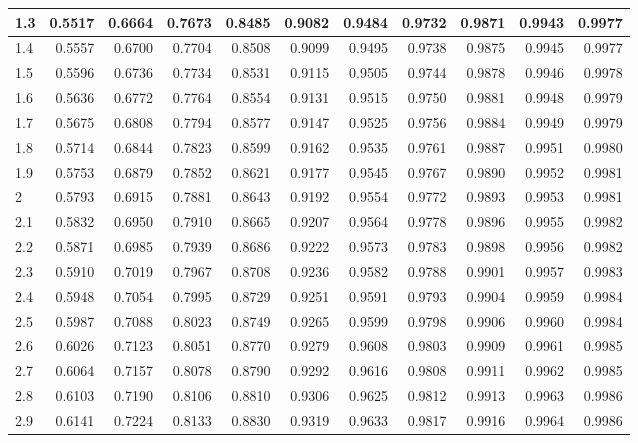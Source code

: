 \documentclass[
  12pt,
]{book}
\theoremstyle{definition}
\theoremstyle{definition}
\theoremstyle{definition}
\theoremstyle{definition}
\theoremstyle{remark}
\begin{document}
\begin{table}
\begin{tabular}[t]{l|r|r|r|r|r|r|r|r|r|r}
\hline
1.3 & 0.5517 & 0.6664 & 0.7673 & 0.8485 & 0.9082 & 0.9484 & 0.9732 & 0.9871 & 0.9943 & 0.9977\\
\hline
1.4 & 0.5557 & 0.6700 & 0.7704 & 0.8508 & 0.9099 & 0.9495 & 0.9738 & 0.9875 & 0.9945 & 0.9977\\
\hline
1.5 & 0.5596 & 0.6736 & 0.7734 & 0.8531 & 0.9115 & 0.9505 & 0.9744 & 0.9878 & 0.9946 & 0.9978\\
\hline
1.6 & 0.5636 & 0.6772 & 0.7764 & 0.8554 & 0.9131 & 0.9515 & 0.9750 & 0.9881 & 0.9948 & 0.9979\\
\hline
1.7 & 0.5675 & 0.6808 & 0.7794 & 0.8577 & 0.9147 & 0.9525 & 0.9756 & 0.9884 & 0.9949 & 0.9979\\
\hline
1.8 & 0.5714 & 0.6844 & 0.7823 & 0.8599 & 0.9162 & 0.9535 & 0.9761 & 0.9887 & 0.9951 & 0.9980\\
\hline
1.9 & 0.5753 & 0.6879 & 0.7852 & 0.8621 & 0.9177 & 0.9545 & 0.9767 & 0.9890 & 0.9952 & 0.9981\\
\hline
2 & 0.5793 & 0.6915 & 0.7881 & 0.8643 & 0.9192 & 0.9554 & 0.9772 & 0.9893 & 0.9953 & 0.9981\\
\hline
2.1 & 0.5832 & 0.6950 & 0.7910 & 0.8665 & 0.9207 & 0.9564 & 0.9778 & 0.9896 & 0.9955 & 0.9982\\
\hline
2.2 & 0.5871 & 0.6985 & 0.7939 & 0.8686 & 0.9222 & 0.9573 & 0.9783 & 0.9898 & 0.9956 & 0.9982\\
\hline
2.3 & 0.5910 & 0.7019 & 0.7967 & 0.8708 & 0.9236 & 0.9582 & 0.9788 & 0.9901 & 0.9957 & 0.9983\\
\hline
2.4 & 0.5948 & 0.7054 & 0.7995 & 0.8729 & 0.9251 & 0.9591 & 0.9793 & 0.9904 & 0.9959 & 0.9984\\
\hline
2.5 & 0.5987 & 0.7088 & 0.8023 & 0.8749 & 0.9265 & 0.9599 & 0.9798 & 0.9906 & 0.9960 & 0.9984\\
\hline
2.6 & 0.6026 & 0.7123 & 0.8051 & 0.8770 & 0.9279 & 0.9608 & 0.9803 & 0.9909 & 0.9961 & 0.9985\\
\hline
2.7 & 0.6064 & 0.7157 & 0.8078 & 0.8790 & 0.9292 & 0.9616 & 0.9808 & 0.9911 & 0.9962 & 0.9985\\
\hline
2.8 & 0.6103 & 0.7190 & 0.8106 & 0.8810 & 0.9306 & 0.9625 & 0.9812 & 0.9913 & 0.9963 & 0.9986\\
\hline
2.9 & 0.6141 & 0.7224 & 0.8133 & 0.8830 & 0.9319 & 0.9633 & 0.9817 & 0.9916 & 0.9964 & 0.9986\\
\hline
\end{tabular}
\end{table}
\end{document}
